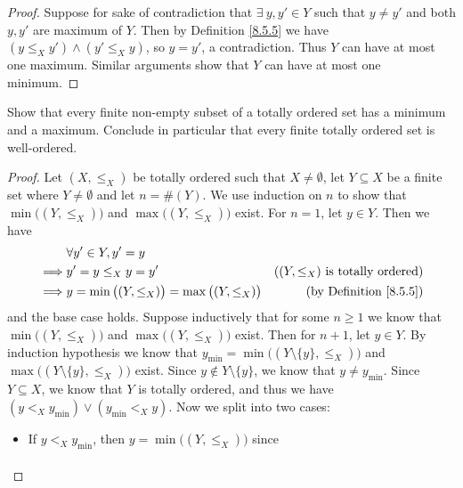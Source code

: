 \begin{proof}
    Suppose for sake of contradiction that \(\exists\ y, y' \in Y\) such that \(y \neq y'\) and both \(y, y'\) are maximum of \(Y\).
    Then by Definition \ref{8.5.5} we have \((y \leq_X y') \land (y' \leq_X y)\), so \(y = y'\), a contradiction.
    Thus \(Y\) can have at most one maximum.
    Similar arguments show that \(Y\) can have at most one minimum.
\end{proof}

\begin{exercise}\label{ex 8.5.8}
    Show that every finite non-empty subset of a totally ordered set has a minimum and a maximum.
    Conclude in particular that every finite totally ordered set is well-ordered.
\end{exercise}

\begin{proof}
    Let \((X, \leq_X)\) be totally ordered such that \(X \neq \emptyset\), let \(Y \subseteq X\) be a finite set where \(Y \neq \emptyset\) and let \(n = \#(Y)\).
    We use induction on \(n\) to show that \(\min\big((Y, \leq_X)\big)\) and \(\max\big((Y, \leq_X)\big)\) exist.
    For \(n = 1\), let \(y \in Y\).
    Then we have
    \begin{align*}
                 & \forall y' \in Y, y' = y                                                                                \\
        \implies & y' = y \leq_X y = y'                                      & \text{(\((Y, \leq_X)\) is totally ordered)} \\
        \implies & y = \min\big((Y, \leq_X)\big) = \max\big((Y, \leq_X)\big) & \text{(by Definition \ref{8.5.5})}
    \end{align*}
    and the base case holds.
    Suppose inductively that for some \(n \geq 1\) we know that \(\min\big((Y, \leq_X)\big)\) and \(\max\big((Y, \leq_X)\big)\) exist.
    Then for \(n + 1\), let \(y \in Y\).
    By induction hypothesis we know that \(y_{\min} = \min\big((Y \setminus \{y\}, \leq_X)\big)\) and \(\max\big((Y \setminus \{y\}, \leq_X)\big)\) exist.
    Since \(y \notin Y \setminus \{y\}\), we know that \(y \neq y_{\min}\).
    Since \(Y \subseteq X\), we know that \(Y\) is totally ordered, and thus we have \((y <_X y_{\min}) \lor (y_{\min} <_X y)\).
    Now we split into two cases:
    \begin{itemize}
        \item If \(y <_X y_{\min}\), then \(y = \min\big((Y, \leq_X)\big)\) since
              \begin{align*}

\end{align*}
\end{itemize}
\end{proof}
